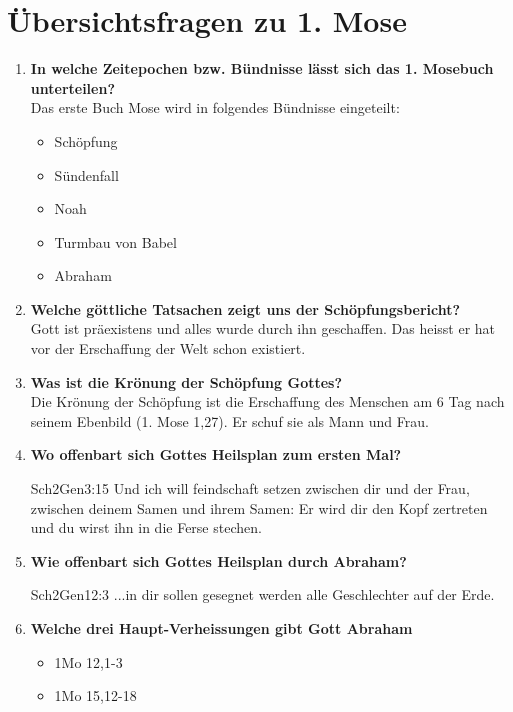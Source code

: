 \section{Übersichtsfragen zu 1. Mose}
\begin{enumerate}
    \item \textbf{In welche Zeitepochen bzw. Bündnisse
    lässt sich das 1. Mosebuch unterteilen?}\\
    Das erste Buch Mose wird in folgendes Bündnisse eingeteilt:
    \begin{itemize}
        \item Schöpfung
        \item Sündenfall
        \item Noah
        \item Turmbau von Babel
        \item Abraham
    \end{itemize}
    \item \textbf{Welche göttliche Tatsachen zeigt uns der Schöpfungsbericht?}\\
    Gott ist präexistens und alles wurde durch ihn geschaffen. Das heisst er hat vor der Erschaffung der Welt schon existiert.
    \item \textbf{Was ist die Krönung der Schöpfung Gottes?}\\
    Die Krönung der Schöpfung ist die Erschaffung des Menschen am 6 Tag nach seinem Ebenbild (1. Mose 1,27). Er schuf sie als Mann und Frau.
    \item \textbf{Wo offenbart sich Gottes Heilsplan zum ersten Mal?}
    \begin{bibeltext}{Sch2}{Gen}{3:15}
        Und ich will feindschaft setzen zwischen dir und der Frau, zwischen deinem Samen und ihrem Samen: Er wird dir den Kopf zertreten und du wirst ihn in die Ferse stechen.
    \end{bibeltext}
    \item \textbf{Wie offenbart sich Gottes Heilsplan durch Abraham?}
    \begin{bibeltext}{Sch2}{Gen}{12:3}
        ...in dir sollen gesegnet werden alle Geschlechter auf der Erde.
    \end{bibeltext}
    \item \textbf{Welche drei Haupt-Verheissungen gibt Gott Abraham }
        \begin{itemize}
            \item 1Mo 12,1-3
            \item 1Mo 15,12-18
        \end{itemize}

\end{enumerate}
